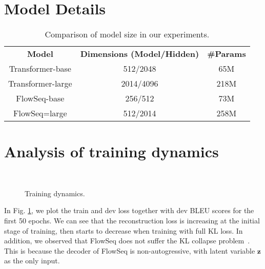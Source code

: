 \documentclass[11pt,a4paper]{article}
\newcommand{\zv}{\mathbf{z}}
\begin{document}
\section{Model Details}
\label{appendix:model}
\begin{table}[!ht]
\centering
\begin{tabular}[t]{ccc}
\toprule
\textbf{Model} & \textbf{Dimensions (Model/Hidden)} & \textbf{\#Params} \\
Transformer-base & 512/2048 & 65M \\
Transformer-large & 2014/4096 & 218M \\
\midrule
FlowSeq-base & 256/512 & 73M \\
FlowSeq=large & 512/2014 & 258M \\
\bottomrule
\end{tabular}
\caption{Comparison of model size in our experiments.}
\label{tab:model_size}
\end{table}

\newpage
\section{Analysis of training dynamics}
\begin{figure}[h]
  \begin{minipage}[t]{1.0\columnwidth}
  \centering
  \\
  \end{minipage}
  \caption{Training dynamics.}
  \label{fig:dynamic}
\end{figure}
In Fig. \ref{fig:dynamic}, we plot the train and dev loss together with dev BLEU scores for the first 50 epochs. We can see that the reconstruction loss is increasing at the initial stage of training, then starts to decrease when training with full KL loss.
In addition, we observed that FlowSeq does not suffer the KL collapse problem~\citep{bowman2015generating,iclr2019:ma:mae}.
This is because the decoder of FlowSeq is non-autogressive, with latent variable $\zv$ as the only input.

\newpage
\end{document}
